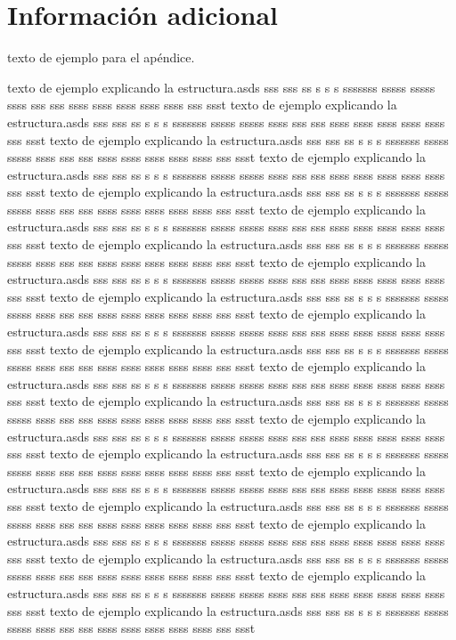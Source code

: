 \section{Información adicional}
texto de ejemplo para el apéndice.

texto de ejemplo explicando la estructura.asds sss sss ss s s s sssssss sssss sssss ssss sss sss ssss ssss ssss ssss ssss sss ssst texto de ejemplo explicando la estructura.asds sss sss ss s s s sssssss sssss sssss ssss sss sss ssss ssss ssss ssss ssss sss ssst texto de ejemplo explicando la estructura.asds sss sss ss s s s sssssss sssss sssss ssss sss sss ssss ssss ssss ssss ssss sss ssst texto de ejemplo explicando la estructura.asds sss sss ss s s s sssssss sssss sssss ssss sss sss ssss ssss ssss ssss ssss sss ssst texto de ejemplo explicando la estructura.asds sss sss ss s s s sssssss sssss sssss ssss sss sss ssss ssss ssss ssss ssss sss ssst texto de ejemplo explicando la estructura.asds sss sss ss s s s sssssss sssss sssss ssss sss sss ssss ssss ssss ssss ssss sss ssst texto de ejemplo explicando la estructura.asds sss sss ss s s s sssssss sssss sssss ssss sss sss ssss ssss ssss ssss ssss sss ssst texto de ejemplo explicando la estructura.asds sss sss ss s s s sssssss sssss sssss ssss sss sss ssss ssss ssss ssss ssss sss ssst texto de ejemplo explicando la estructura.asds sss sss ss s s s sssssss sssss sssss ssss sss sss ssss ssss ssss ssss ssss sss ssst texto de ejemplo explicando la estructura.asds sss sss ss s s s sssssss sssss sssss ssss sss sss ssss ssss ssss ssss ssss sss ssst texto de ejemplo explicando la estructura.asds sss sss ss s s s sssssss sssss sssss ssss sss sss ssss ssss ssss ssss ssss sss ssst texto de ejemplo explicando la estructura.asds sss sss ss s s s sssssss sssss sssss ssss sss sss ssss ssss ssss ssss ssss sss ssst texto de ejemplo explicando la estructura.asds sss sss ss s s s sssssss sssss sssss ssss sss sss ssss ssss ssss ssss ssss sss ssst texto de ejemplo explicando la estructura.asds sss sss ss s s s sssssss sssss sssss ssss sss sss ssss ssss ssss ssss ssss sss ssst texto de ejemplo explicando la estructura.asds sss sss ss s s s sssssss sssss sssss ssss sss sss ssss ssss ssss ssss ssss sss ssst texto de ejemplo explicando la estructura.asds sss sss ss s s s sssssss sssss sssss ssss sss sss ssss ssss ssss ssss ssss sss ssst texto de ejemplo explicando la estructura.asds sss sss ss s s s sssssss sssss sssss ssss sss sss ssss ssss ssss ssss ssss sss ssst texto de ejemplo explicando la estructura.asds sss sss ss s s s sssssss sssss sssss ssss sss sss ssss ssss ssss ssss ssss sss ssst texto de ejemplo explicando la estructura.asds sss sss ss s s s sssssss sssss sssss ssss sss sss ssss ssss ssss ssss ssss sss ssst texto de ejemplo explicando la estructura.asds sss sss ss s s s sssssss sssss sssss ssss sss sss ssss ssss ssss ssss ssss sss ssst texto de ejemplo explicando la estructura.asds sss sss ss s s s sssssss sssss sssss ssss sss sss ssss ssss ssss ssss ssss sss ssst 